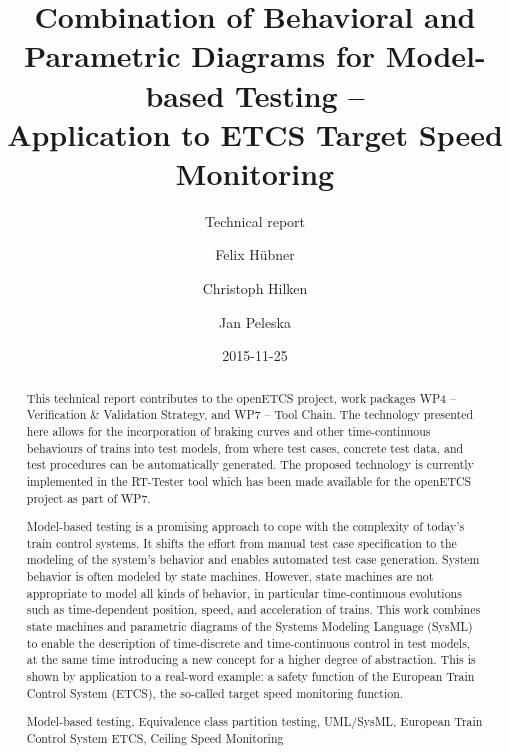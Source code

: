\documentclass{template/openetcs_article}
\newcommand{\keywords}[1]{\par\addvspace\baselineskip
\noindent {\bf Keywords} \enspace\ignorespaces#1}
\begin{document}
\frontmatter
{}




\title{Combination of Behavioral and Parametric Diagrams for Model-based Testing --\\
Application to ETCS Target Speed Monitoring}

\subtitle{Technical report}

\date{2015-11-25}

 

\author{Felix H{\"u}bner \and  Christoph Hilken \and Jan Peleska}


\begin{abstract}
This technical report contributes to the openETCS project, work packages 
WP4 -- Verification \& Validation Strategy, and WP7 -- Tool Chain. 
The technology presented here allows for the incorporation of braking curves and 
other time-continuous behaviours of trains into test models, from where test cases, 
concrete test data, and test procedures can be automatically generated.
The proposed technology is currently implemented in the RT-Tester tool which has been 
made available for the openETCS project as part of WP7.

Model-based testing is a promising approach to cope with the complexity 
of today's train control  systems. 
It shifts the effort from manual test case specification to the 
modeling of the system's behavior and enables automated test case generation.   
System behavior is often modeled by state machines. However, state machines are not 
appropriate to model all kinds of behavior, in particular time-continuous evolutions
such as time-dependent position, speed,  and 
acceleration of trains. This work combines state machines
and parametric diagrams of the Systems Modeling Language (SysML) to 
enable the description of time-discrete and time-continuous control in test models,
at the same time introducing a new concept for a higher degree of abstraction. This is shown by application 
to a real-word example: a safety function of the European Train Control System (ETCS), the so-called target speed monitoring function.


\keywords{Model-based testing, Equivalence class partition testing, UML/SysML, European Train Control System ETCS, Ceiling Speed Monitoring}
\end{abstract}

\maketitle










\end{document}
